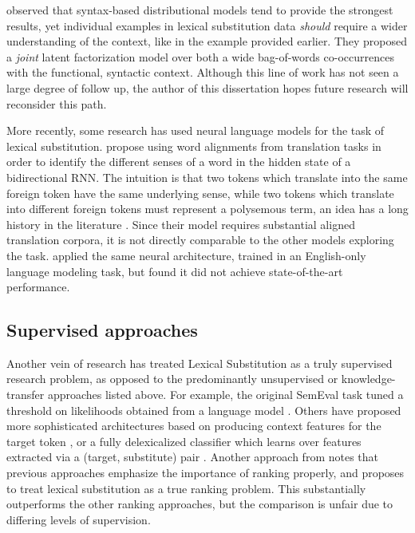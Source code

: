  observed that syntax-based distributional
models tend to provide the strongest results, yet individual examples in
lexical substitution data {\em should} require a wider understanding of the
context, like in the  example provided earlier. They proposed a
{\em joint} latent factorization model over both a wide bag-of-words
co-occurrences with the functional, syntactic context. Although this line of
work has not seen a large degree of follow up, the author of this dissertation
hopes future research will reconsider this path.

More recently, some research has used neural language models for the task
of lexical substitution.  propose using word
alignments from translation tasks in order to identify the different senses of
a word in the hidden state of a bidirectional RNN. The intuition is that two
tokens which translate into the same foreign token have the same underlying
sense, while two tokens which translate into different foreign tokens must
represent a polysemous term, an idea has a long history in the literature
\cite{resnik:1999:nle,diab:2003:phd,bannard:2005:acl}. Since their model
requires substantial aligned translation corpora, it is not directly comparable
to the other models exploring the task. 
applied the same neural architecture, trained in an English-only language
modeling task, but found it did not achieve state-of-the-art performance.

\subsection{Supervised approaches}

Another vein of research has treated Lexical Substitution as a truly
supervised research problem, as opposed to the predominantly unsupervised or
knowledge-transfer approaches listed above. For example, the original SemEval
task tuned a threshold on likelihoods obtained from a language
model \cite{yuret:2007:semeval}. Others have proposed more sophisticated
architectures based on producing context features for the target token
\cite{biemann:2012:lrec}, or a fully delexicalized classifier which learns over
features extracted via a (target, substitute) pair \cite{szarvas:2013:naacl}.
Another approach from  notes that previous
approaches emphasize the importance of ranking properly, and proposes to treat
lexical substitution as a true ranking problem. This substantially outperforms
the other ranking approaches, but the comparison is unfair due to differing
levels of supervision.

